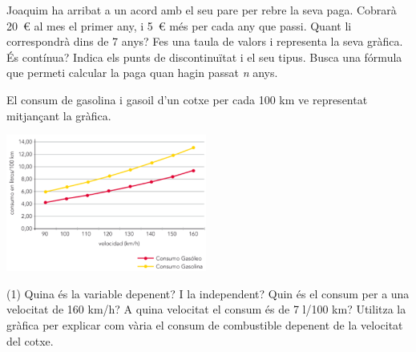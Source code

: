 \begin{mylist}
\exer  Joaquim ha arribat a un acord amb el seu pare per rebre la seva paga. Cobrarà 20~€ al mes el primer any, i 5~€ més per cada any que passi. Quant li correspondrà dins de 7 anys? Fes una taula de valors i representa la seva gràfica. És contínua? Indica els punts de discontinuïtat i el seu tipus. Busca una fórmula que permeti calcular la paga quan hagin passat \textit{n} anys.


	\exer  
	El consum de gasolina i gasoil d'un cotxe per cada 100 km ve representat mitjançant la gràfica.
	
	\begin{minipage}{0.4\textwidth}
		\centering
		\includegraphics[height=4.5cm]{img-08/consumo}
	\end{minipage}
	\begin{minipage}{0.55\textwidth}
	\begin{tasks}(1)
		\task  Quina és la variable depenent? 
		\task  I la independent?
		\task  Quin és el consum per a una velocitat de 160 km/h?
		\task  A quina velocitat el consum és de 7 l/100 km?
		\task  Utilitza la gràfica per explicar com vària el consum de combustible depenent de la velocitat del cotxe.
	\end{tasks}
	\end{minipage}

  

\end{mylist}
